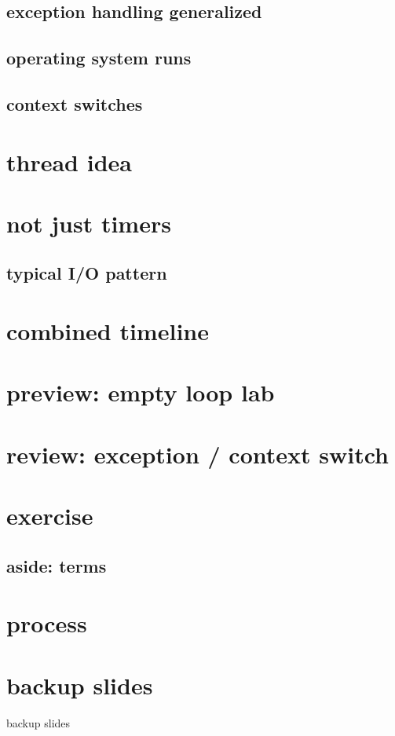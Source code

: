\subsection{exception handling generalized}


\subsection{operating system runs}


\subsection{context switches} 


\section{thread idea}


\section{not just timers}

\subsection{typical I/O pattern}




\section{combined timeline}


\section{preview: empty loop lab}


\section{review: exception / context switch}


\section{exercise}


\subsection{aside: terms}


\section{process}




\section{backup slides}
\begin{frame}{backup slides}
\end{frame}


